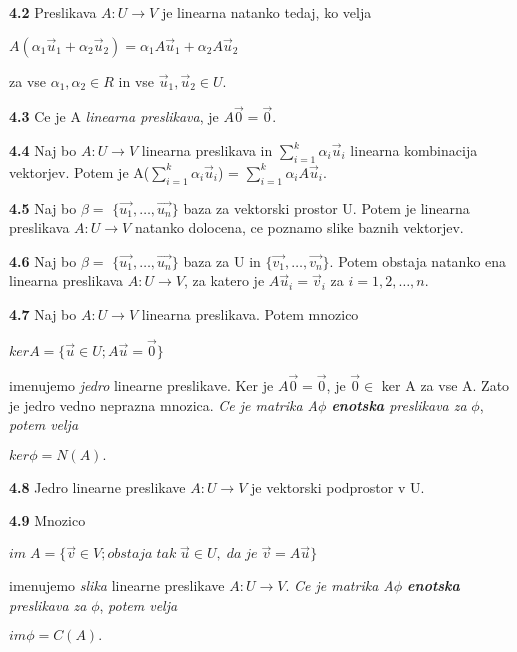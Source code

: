 \documentclass{article}
\begin{document}
\begin{multicols}{4}
	\textbf{4.2} Preslikava $A: U \rightarrow V$ je linearna natanko tedaj, ko velja
	\begin{center}
		$A(\alpha_{1}\vec{u}_{1} + \alpha_{2}\vec{u}_{2}) = \alpha_{1}A\vec{u}_{1} + \alpha_{2}A\vec{u}_{2}$
	\end{center}
	za vse $\alpha_{1}, \alpha_{2} \in R$ in vse $\vec{u}_{1}, \vec{u}_{2} \in U$.

	\textbf{4.3} Ce je A \textit{linearna preslikava}, je $A\vec{0} = \vec{0}$.

	\textbf{4.4} Naj bo $A: U \rightarrow V$ linearna preslikava in $\sum_{i=1}^{k} \alpha_{i}\vec{u}_{i}$
	linearna kombinacija vektorjev. Potem je A($\sum_{i=1}^{k} \alpha_{i}\vec{u}_{i}$) = $\sum_{i=1}^{k} \alpha_{i}A\vec{u}_{i}$.

	\textbf{4.5} Naj bo $\beta =$ $\{ \vec{u_{1}}, \dots,\vec{u_{n}}\}$ baza za vektorski prostor U. Potem je linearna
	preslikava $A: U \rightarrow V$ natanko dolocena, ce poznamo slike baznih vektorjev.

	\textbf{4.6} Naj bo $\beta =$ $\{\vec{u_{1}}, \dots,\vec{u_{n}}\}$ baza za U in $\{\vec{v_{1}}, \dots,\vec{v_{n}}\}$.
	Potem obstaja natanko ena linearna preslikava $A: U \rightarrow V$, za katero je $A\vec{u}_{i} = \vec{v}_{i}$ za $i = 1, 2, \dots, n$.

	\textbf{4.7} Naj bo $A: U \rightarrow V$ linearna preslikava. Potem mnozico
	\begin{center}
		$ker A = \{ \vec{u} \in U; A\vec{u} = \vec{0}\}$
	\end{center}
	imenujemo \textit{jedro} linearne preslikave. Ker je $A\vec{0} = \vec{0}$, je $\vec{0} \in$ ker A za vse A.
	Zato je jedro vedno neprazna mnozica.
	\textit{Ce je matrika A$\phi$ \textbf{enotska} preslikava za } $\phi$, \textit{potem velja}
	\begin{center}
		\begin{math}
			ker \phi = N(A).
		\end{math}
	\end{center}

	\textbf{4.8} Jedro linearne preslikave $A: U \rightarrow V$ je vektorski podprostor v U.

	\textbf{4.9} Mnozico
	\begin{center}
		$im\; A = \{ \vec{v} \in V; obstaja\; tak\; \vec{u} \in U,\; da\; je\; \vec{v} = A\vec{u} \}$
	\end{center}
	imenujemo \textit{slika} linearne preslikave $A: U \rightarrow V$.
	\textit{Ce je matrika A$\phi$ \textbf{enotska} preslikava za } $\phi$, \textit{potem velja}
	\begin{center}
		\begin{math}
			im \phi = C(A).
		\end{math}
	\end{center}


\end{multicols}
\end{document}
